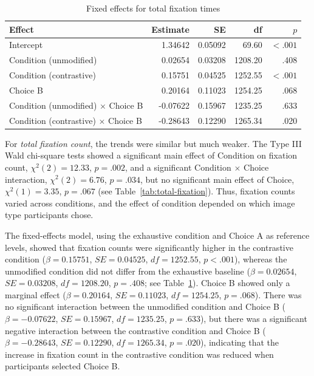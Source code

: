 \documentclass[ruler]{CUP-JNL-LIN}%
\begin{document}
\begin{table}[htbp]
\centering
\caption{Fixed effects for total fixation times}
\label{tab:total-fixation-fixed}
\begin{tabularx}{\textwidth}{@{}Xrrrr@{}}
\toprule
Effect & Estimate & SE & df & $p$ \\
\midrule
Intercept & 1.34642 & 0.05092 & 69.60 & $< .001$ \\
Condition (unmodified) & 0.02654 & 0.03208 & 1208.20 & .408 \\
Condition (contrastive) & 0.15751 & 0.04525 & 1252.55 & $< .001$ \\
Choice B & 0.20164 & 0.11023 & 1254.25 & .068 \\
Condition (unmodified) $\times$ Choice B & -0.07622 & 0.15967 & 1235.25 & .633 \\
Condition (contrastive) $\times$ Choice B & -0.28643 & 0.12290 & 1265.34 & .020 \\
\bottomrule
\end{tabularx}
\end{table}

For \textit{total fixation count}, the trends were similar but much weaker. The Type III Wald chi-square tests showed a significant main effect of Condition on fixation count, $\chi^2(2)=12.33$, $p=.002$, and a significant Condition $\times$ Choice interaction, $\chi^2(2)=6.76$, $p=.034$, but no significant main effect of Choice, $\chi^2(1)=3.35$, $p=.067$ (see Table~\ref{tab:total-fixation}). Thus, fixation counts varied across conditions, and the effect of condition depended on which image type participants chose.

The fixed-effects model, using the exhaustive condition and Choice A as reference levels, showed that fixation counts were significantly higher in the contrastive condition ($\beta=0.15751$, $SE=0.04525$, $df=1252.55$, $p<.001$), whereas the unmodified condition did not differ from the exhaustive baseline ($\beta=0.02654$, $SE=0.03208$, $df=1208.20$, $p=.408$; see Table~\ref{tab:total-fixation-fixed}). Choice B showed only a marginal effect ($\beta=0.20164$, $SE=0.11023$, $df=1254.25$, $p=.068$). There was no significant interaction between the unmodified condition and Choice B ($\beta=-0.07622$, $SE=0.15967$, $df=1235.25$, $p=.633$), but there was a significant negative interaction between the contrastive condition and Choice B ($\beta=-0.28643$, $SE=0.12290$, $df=1265.34$, $p=.020$), indicating that the increase in fixation count in the contrastive condition was reduced when participants selected Choice B.
\end{document}
